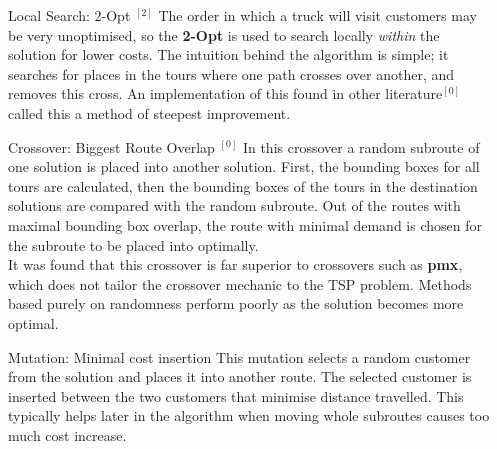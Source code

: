 \documentclass[ %
                    author={Callum Mann},
                     title={Genetic algorithm for the CVRP},
                  subtitle={Capacitated Vehicle Routing Problem},
                      type={Heuristic},
                      year={2016}]{poster}
\begin{document}
\begin{frame}{}
\begin{columns}[t]
\begin{column}{0.422\linewidth}
  \end{column}

  \begin{column}{0.450\linewidth}
    \begin{block}{\Large Local Search: 2-Opt $^{[2]}$}
      The order in which a truck will visit customers may be very unoptimised, so the \textbf{2-Opt} is used
      to search locally \textit{within} the solution for lower costs. The intuition behind the algorithm
      is simple; it searches for places in the tours where one path crosses over another, and removes this cross.
      An implementation of this found in other literature$^{[0]}$ called this a method of steepest improvement.
    \end{block}
    \vspace{1cm}

    \vfill

    \begin{block}{\Large Crossover: Biggest Route Overlap $^{[0]}$}
      In this crossover a random subroute of one solution is placed into another
      solution. First, the bounding boxes for all tours are calculated, then
      the bounding boxes of the tours in the destination solutions are compared
      with the random subroute. Out of the routes with maximal bounding box overlap,
      the route with minimal demand is chosen for the subroute to be placed into optimally. \\ \vspace{1cm}
      It was found that this crossover is far superior to crossovers such as \textbf{pmx},
      which does not tailor the crossover mechanic to the TSP problem. Methods based purely
      on randomness perform poorly as the solution becomes more optimal.
    \end{block}
    \vspace{1cm}

    \begin{block}{\Large Mutation: Minimal cost insertion}
      This mutation selects a random customer from the solution and places it into
      another route. The selected customer is inserted between the two customers
      that minimise distance travelled. This typically helps later in the
      algorithm when moving whole subroutes causes too much cost increase.
    \end{block}
    \vspace{1cm}


\end{column}
\end{columns}
\end{frame}
\end{document}
